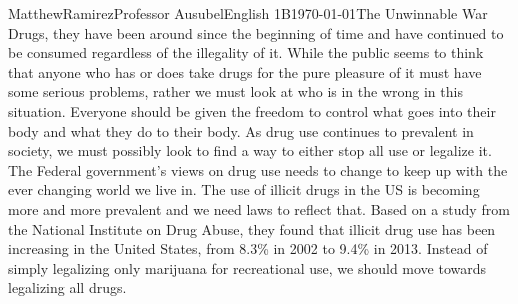 \documentclass[12pt,letterpaper]{article}
\begin{document}
\begin{mla}{Matthew}{Ramirez}{Professor Ausubel}{English 1B}{\today}{The Unwinnable War}
\label{Introduction}
Drugs, they have been around since the beginning of time and have continued to be consumed regardless of the illegality of it. While the public seems to think that anyone who has or does take drugs for the pure pleasure of it must have some serious problems, rather we must look at who is in the wrong in this situation. Everyone should be given the freedom to control what goes into their body and what they do to their body. As drug use continues to prevalent in society, we must possibly look to find a way to either stop all use or legalize it. The Federal government's views on drug use needs to change to keep up with the ever changing world we live in. The use of illicit drugs in the US is becoming more and more prevalent and we need laws to reflect that. Based on a study from the National Institute on Drug Abuse, they found that illicit drug use has been increasing in the United States, from 8.3\% in 2002 to 9.4\% in 2013. Instead of simply legalizing only marijuana for recreational use, we should move towards legalizing all drugs.\\
\label{The Culture of Drugs}

\end{mla}
\end{document}
